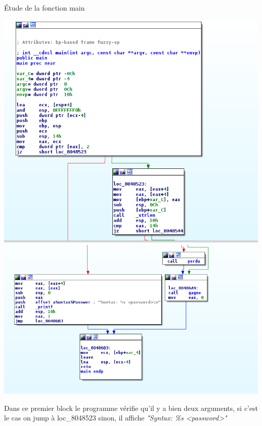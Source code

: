 \documentclass[10pt,sans,usenames,dvipsnames,french,compress]{beamer}
\begin{document}

\begin{frame}[fragile]{Étude de la fonction main}
	\begin{center}
		\includegraphics[width=0.5\linewidth]{114/main.png}
		\includegraphics[width=0.5\linewidth]{114/syntax.png}
	\end{center}

	\begin{block}{}
		Dans ce premier block le programme vérifie qu'il y a bien deux arguments, si c'est le cas on jump à loc\_8048523 sinon, il affiche \textit{"Syntax: \%s <password>"}
	\end{block}
\end{frame}
\end{document}
